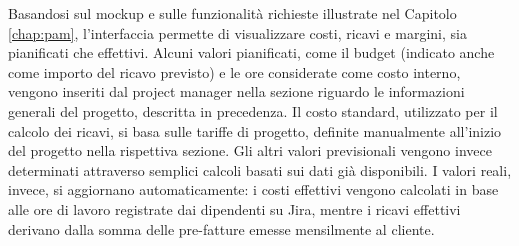 Basandosi sul mockup e sulle funzionalità richieste illustrate nel Capitolo \ref{chap:pam}, l’interfaccia permette
di visualizzare costi, ricavi e margini, sia pianificati che effettivi.
Alcuni valori pianificati, come il budget (indicato anche come importo del ricavo previsto) e le ore considerate
come costo interno, vengono inseriti dal project manager nella sezione riguardo le informazioni generali
del progetto, descritta in precedenza.
Il costo standard, utilizzato per il calcolo dei ricavi, si basa sulle tariffe di progetto, definite manualmente all’inizio del
progetto nella rispettiva sezione.
Gli altri valori previsionali vengono invece determinati attraverso semplici calcoli basati sui dati già disponibili.
I valori reali, invece, si aggiornano automaticamente: i costi effettivi vengono calcolati in base alle ore di lavoro
registrate dai dipendenti su Jira, mentre i ricavi effettivi derivano dalla somma delle pre-fatture emesse mensilmente al cliente.